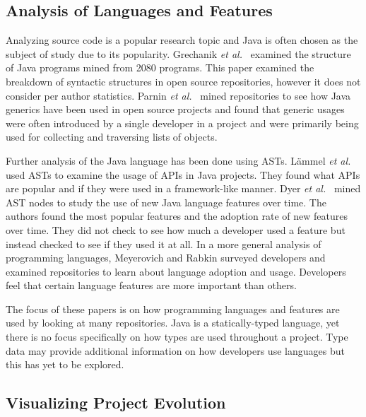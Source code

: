\subsection{Analysis of Languages and Features}

Analyzing source code is a popular research topic and Java is often chosen as the subject of study due to its popularity. Grechanik \textit{et al.}~\cite{Grechanik:2010:EIL:1852786.1852801} examined the structure of Java programs mined from 2080 programs. This paper examined the breakdown of syntactic structures in open source repositories, however it does not consider per author statistics. Parnin \textit{et al.}~\cite{Parnin:2011:JGA:1985441.1985446} mined repositories to see how Java generics have been used in open source projects and found that generic usages were often introduced by a single developer in a project and were primarily being used for collecting and traversing lists of objects.

Further analysis of the Java language has been done using ASTs. L\"{a}mmel \textit{et al.}~\cite{Lammel:2011:LAA:1982185.1982471} used ASTs to examine the usage of APIs in Java projects. They found what APIs are popular and if they were used in a framework-like manner. Dyer \textit{et al.}~\cite{Dyer:2014:MBA:2568225.2568295} mined AST nodes to study the use of new Java language features over time. The authors found the most popular features and the adoption rate of new features over time. They did not check to see how much a developer used a feature but instead checked to see if they used it at all. In a more general analysis of programming languages, Meyerovich and Rabkin \cite{Meyerovich:2013:EAP:2509136.2509515} surveyed developers and examined repositories to learn about language adoption and usage. Developers feel that certain language features are more important than others.

The focus of these papers is on how programming languages and features are used by looking at many repositories. Java is a statically-typed language, yet there is no focus specifically on how types are used throughout a project. Type data may provide additional information on how developers use languages but this has yet to be explored.

\subsection{Visualizing Project Evolution}

